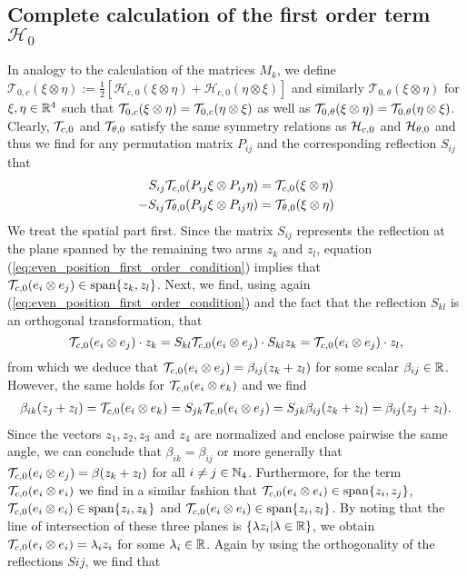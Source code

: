 \subsection{Complete calculation of the first order term $\mathcal{H}_0$}
 
 In analogy to the calculation of the matrices $M_k$, we define $\mathcal{T}_{0, c}(\xi \otimes \eta) := \tfrac{1}{2}  [\mathcal{H}_{c,0}(\xi \otimes \eta) + \mathcal{H}_{c,0}(\eta \otimes \xi)]$ and similarly $\mathcal{T}_{0, \theta}(\xi \otimes \eta)$ for $\xi, \eta \in \mathbb{R}^4$ such that $\mathcal{T}_{0,c}(\xi \otimes \eta) = \mathcal{T}_{0,c}(\eta \otimes \xi)$ as well as $\mathcal{T}_{0,\theta}(\xi \otimes \eta) = \mathcal{T}_{0,\theta}(\eta \otimes \xi)$. Clearly, $\mathcal{T}_{c,0}$ and $\mathcal{T}_{\theta,0}$ satisfy the same symmetry relations as $\mathcal{H}_{c,0}$ and $\mathcal{H}_{\theta,0}$ and thus we find for any permutation matrix $P_{ij}$ and the corresponding reflection $S_{ij}$ that
\begin{align}
\label{eq:even_position_first_order_condition}
 S_{ij}\mathcal{T}_{c,0}(P_{ij} \xi \otimes P_{ij} \eta) &= \mathcal{T}_{c,0}(\xi \otimes \eta)\\
 \label{eq:even_angle_first_order_condition}
  -S_{ij}\mathcal{T}_{\theta,0}(P_{ij} \xi \otimes P_{ij} \eta) &= \mathcal{T}_{\theta,0}(\xi \otimes \eta)
\end{align}
We treat the spatial part first. Since the matrix $S_{ij}$ represents the reflection at the plane spanned by the remaining two arms $z_k$ and $z_l$, equation (\ref{eq:even_position_first_order_condition}) implies that $\mathcal{T}_{c,0}(e_i \otimes e_j) \in \operatorname{span}\{z_k, z_l\}$. Next, we find, using again (\ref{eq:even_position_first_order_condition}) and the fact that the reflection $S_{kl}$ is an orthogonal transformation, that
\begin{equation}
\mathcal{T}_{c,0}(e_i \otimes e_j) \cdot z_k = S_{kl}\mathcal{T}_{c,0}(e_i \otimes e_j) \cdot S_{kl} z_k = \mathcal{T}_{c,0}(e_i \otimes e_j) \cdot z_l,
\end{equation}
from which we deduce that $\mathcal{T}_{c,0}(e_i \otimes e_j) = \beta_{ij} (z_k + z_l)$ for some scalar $\beta_{ij} \in \mathbb{R}$. However, the same holds for $\mathcal{T}_{c,0}(e_i \otimes e_k)$ and we find
\begin{align}
\beta_{ik} (z_j + z_l) = \mathcal{T}_{c,0}(e_i \otimes e_k) = S_{jk} \mathcal{T}_{c,0}(e_i \otimes e_j) = S_{jk} \beta_{ij} (z_k + z_l) = \beta_{ij} (z_j + z_l).
\end{align}
Since the vectors $z_1, z_2, z_3$ and $z_4$ are normalized and enclose pairwise the same angle, we can conclude that $\beta_{ik} = \beta_{ij}$ or more generally that $\mathcal{T}_{c,0}(e_i \otimes e_j) = \beta (z_k + z_l)$ for all $i \neq j \in \mathbb{N}_4$. Furthermore, for the term $\mathcal{T}_{c,0}(e_i \otimes e_i)$ we find in a similar fashion that $\mathcal{T}_{c,0}(e_i \otimes e_i) \in \operatorname{span}\{z_i, z_j\}$, $\mathcal{T}_{c,0}(e_i \otimes e_i) \in \operatorname{span}\{z_i, z_k\}$ and $\mathcal{T}_{c,0}(e_i \otimes e_i) \in \operatorname{span}\{z_i, z_l\}$. By noting that the line of intersection of these three planes is $\{\lambda z_i | \lambda \in\mathbb{R}\}$, we obtain $\mathcal{T}_{c,0}(e_i \otimes e_i) = \lambda_i z_i$ for some $\lambda_i \in \mathbb{R}$. Again by using the orthogonality of the reflections $Sij$, we find that
